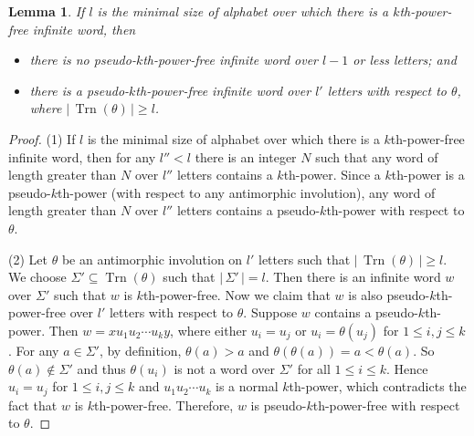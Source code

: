 \documentclass[12pt]{article}
\def\abs#1{{|\,#1\,|}}
\def\tr{{\operatorname{Trn}}}
\newtheorem{lemma}[theorem]{Lemma}
\begin{document}
\begin{lemma}\label{lemma:lemma0}
If $l$ is the minimal size of alphabet over which there is a
$k$th-power-free infinite word, then
\begin{itemize}
  \item[(1)] there is no pseudo-$k$th-power-free infinite word over $l-1$ or less letters;
  and
  \item[(2)] there is a pseudo-$k$th-power-free infinite word over $l'$ letters
  with respect to $\theta$, where $\abs{\tr(\theta)}\geq l$.
\end{itemize}
\end{lemma}
\begin{proof}
(1) If $l$ is the minimal size of alphabet over which there is a
$k$th-power-free infinite word, then for any $l''<l$ there is an
integer $N$ such that any word of length greater than $N$ over $l''$
letters contains a $k$th-power. Since a $k$th-power is a
pseudo-$k$th-power (with respect to any antimorphic involution), any
word of length greater than $N$ over $l''$ letters contains a
pseudo-$k$th-power with respect to $\theta$.

(2) Let $\theta$ be an antimorphic involution on $l'$ letters such
that $\abs{\tr(\theta)}\geq l$. We choose
$\Sigma'\subseteq\tr(\theta)$ such that $\abs{\Sigma'}=l$. Then
there is an infinite word $w$ over $\Sigma'$ such that $w$ is
$k$th-power-free. Now we claim that $w$ is also
pseudo-$k$th-power-free over $l'$ letters with respect to $\theta$.
Suppose $w$ contains a pseudo-$k$th-power. Then $w=xu_1u_2\cdots
u_ky$, where either $u_i=u_j$ or $u_i=\theta(u_j)$ for $1\leq
i,j\leq k$. For any $a\in\Sigma'$, by definition, $\theta(a)>a$ and
$\theta(\theta(a))=a<\theta(a)$. So $\theta(a)\not\in\Sigma'$ and
thus $\theta(u_i)$ is not a word over $\Sigma'$ for all $1\leq i\leq
k$. Hence $u_i=u_j$ for $1\leq i,j\leq k$ and $u_1u_2\cdots u_k$ is
a normal $k$th-power, which contradicts the fact that $w$ is
$k$th-power-free. Therefore, $w$ is pseudo-$k$th-power-free with
respect to $\theta$.
\end{proof}
\end{document}
